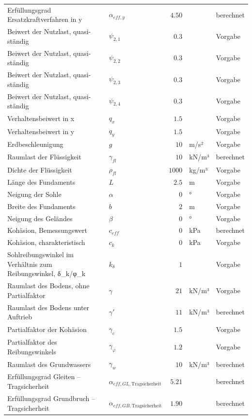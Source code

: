 \documentclass[11pt,a4paper]{article}
\begin{document}
\begin{xltabular}{\linewidth}{>{\raggedright\arraybackslash}Xlrll}
Erfüllungsgrad Ersatzkraftverfahren in y & $\alpha_{eff,y}$ & $4.50$ &  & berechnet \\
Beiwert der Nutzlast, quasi-ständig & $\psi_{2,1}$ & $0.3$ &  & Vorgabe \\
Beiwert der Nutzlast, quasi-ständig & $\psi_{2,2}$ & $0.3$ &  & Vorgabe \\
Beiwert der Nutzlast, quasi-ständig & $\psi_{2,3}$ & $0.3$ &  & Vorgabe \\
Beiwert der Nutzlast, quasi-ständig & $\psi_{2,4}$ & $0.3$ &  & Vorgabe \\
Verhaltensbeiwert in x & $q_x$ & $1.5$ &  & Vorgabe \\
Verhaltensbeiwert in y & $q_y$ & $1.5$ &  & Vorgabe \\
Erdbeschleunigung & $g$ & $10$ & m/s² & Vorgabe \\
Raumlast der Flüssigkeit & $\gamma_{fl}$ & $10$ & kN/m³ & berechnet \\
Dichte der Flüssigkeit & $\rho_{fl}$ & $1000$ & kg/m³ & Vorgabe \\
Länge des Fundaments & $L$ & $2.5$ & m & Vorgabe \\
Neigung der Sohle & $\alpha$ & $0$ & ° & Vorgabe \\
Breite des Fundaments & $b$ & $2$ & m & Vorgabe \\
Neigung des Geländes & $\beta$ & $0$ & ° & Vorgabe \\
Kohäsion, Bemessungswert & $c_{eff}$ & $0$ & kPa & berechnet \\
Kohäsion, charakteristisch & $c_k$ & $0$ & kPa & Vorgabe \\
Sohlreibungswinkel im Verhältnis zum Reibungswinkel, δ\_k/φ\_k & $k_{\delta}$ & $1$ &  & Vorgabe \\
Raumlast des Bodens, ohne Partialfaktor & $\gamma$ & $21$ & kN/m³ & Vorgabe \\
Raumlast des Bodens unter Auftrieb & $\gamma'$ & $11$ & kN/m³ & berechnet \\
Partialfaktor der Kohäsion & $\gamma_c$ & $1.5$ &  & Vorgabe \\
Partialfaktor des Reibungswinkels & $\gamma_{\varphi}$ & $1.2$ &  & Vorgabe \\
Raumlast des Grundwassers & $\gamma_w$ & $10$ & kN/m³ & berechnet \\
Erfüllungsgrad Gleiten – Tragsicherheit & $\alpha_{eff,GL,\text{Tragsicherheit}}$ & $5.21$ &  & berechnet \\
Erfüllungsgrad Grundbruch – Tragsicherheit & $\alpha_{eff,GB,\text{Tragsicherheit}}$ & $1.90$ &  & berechnet \\

\end{xltabular}
\end{document}

